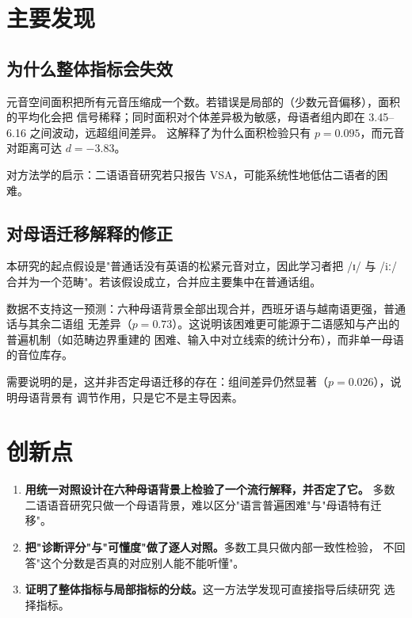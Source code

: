 \documentclass[12pt,a4paper,fontset=fandol]{ctexrep}
\newcommand{\ipa}[1]{/#1/}
\begin{document}
\section{主要发现}

\subsection{为什么整体指标会失效}

元音空间面积把所有元音压缩成一个数。若错误是局部的（少数元音偏移），面积的平均化会把
信号稀释；同时面积对个体差异极为敏感，母语者组内即在 3.45--6.16 之间波动，远超组间差异。
这解释了为什么面积检验只有 $p=0.095$，而元音对距离可达 $d=-3.83$。

对方法学的启示：二语语音研究若只报告 VSA，可能系统性地低估二语者的困难。

\subsection{对母语迁移解释的修正}

本研究的起点假设是"普通话没有英语的松紧元音对立，因此学习者把 \ipa{ɪ} 与 \ipa{iː}
合并为一个范畴"。若该假设成立，合并应主要集中在普通话组。

数据不支持这一预测：六种母语背景全部出现合并，西班牙语与越南语更强，普通话与其余二语组
无差异（$p=0.73$）。这说明该困难更可能源于二语感知与产出的普遍机制（如范畴边界重建的
困难、输入中对立线索的统计分布），而非单一母语的音位库存。

需要说明的是，这并非否定母语迁移的存在：组间差异仍然显著（$p=0.026$），说明母语背景有
调节作用，只是它不是主导因素。

\section{创新点}

\begin{enumerate}[leftmargin=2em,itemsep=2pt]
  \item \textbf{用统一对照设计在六种母语背景上检验了一个流行解释，并否定了它。}
        多数二语语音研究只做一个母语背景，难以区分"语言普遍困难"与"母语特有迁移"。
  \item \textbf{把"诊断评分"与"可懂度"做了逐人对照。}多数工具只做内部一致性检验，
        不回答"这个分数是否真的对应别人能不能听懂"。
  \item \textbf{证明了整体指标与局部指标的分歧。}这一方法学发现可直接指导后续研究
        选择指标。
\end{enumerate}
\end{document}
